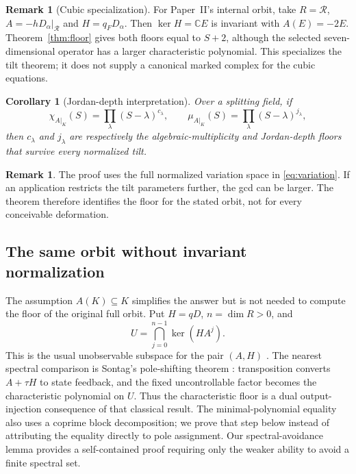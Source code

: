 \documentclass[11pt]{amsart}
\newtheorem{corollary}[theorem]{Corollary}
\theoremstyle{definition}
\newtheorem{remark}[theorem]{Remark}
\begin{document}
\begin{remark}[Cubic specialization]\label{rem:cubic-specialization}
For Paper~II's internal orbit, take $R=\mathcal R$,
$A=-hD_\alpha|_{\mathcal R}$ and $H=q_FD_\alpha$.
Then $\ker H=\mathbb C E$ is invariant with $A(E)=-2E$.
Theorem~\ref{thm:floor} gives both floors equal to $S+2$, although the
selected seven-dimensional operator has a larger characteristic polynomial.
This specializes the tilt theorem; it does not supply a canonical marked
complex for the cubic equations.
\end{remark}

\begin{corollary}[Jordan-depth interpretation]
Over a splitting field, if
\[
\chi_{A|_K}(S)=\prod_\lambda(S-\lambda)^{c_\lambda},
\qquad
\mu_{A|_K}(S)=\prod_\lambda(S-\lambda)^{j_\lambda},
\]
then \(c_\lambda\) and \(j_\lambda\) are respectively the algebraic-multiplicity and
Jordan-depth floors that survive every normalized tilt.
\end{corollary}

\begin{remark}
The proof uses the full normalized variation space in \eqref{eq:variation}. If an application
restricts the tilt parameters further, the gcd can be larger. The theorem therefore identifies the
floor for the stated orbit, not for every conceivable deformation.
\end{remark}


\subsection{The same orbit without invariant normalization}\label{subsec:output-injection}

The assumption \(A(K)\subseteq K\) simplifies the answer but is not needed to
compute the floor of the original full orbit. Put \(H=qD\), \(n=\dim R>0\), and
\[
U=\bigcap_{j=0}^{n-1}\ker(HA^j).
\]
This is the usual unobservable subspace for the pair \((A,H)\)
\cite[Section~6.2]{Sontag1998}.
The nearest spectral comparison is Sontag's pole-shifting theorem
\cite[Section~5.1, Theorem~13, p.~186]{Sontag1998}: transposition converts
$A+\tau H$ to state feedback, and the fixed uncontrollable factor becomes
the characteristic polynomial on $U$. Thus the characteristic floor is
a dual output-injection consequence of that classical result.
The minimal-polynomial equality also uses a coprime block decomposition;
we prove that step below instead of attributing the equality directly
to pole assignment. Our spectral-avoidance lemma provides a self-contained
proof requiring only the weaker ability to avoid a finite spectral set.
\end{document}
